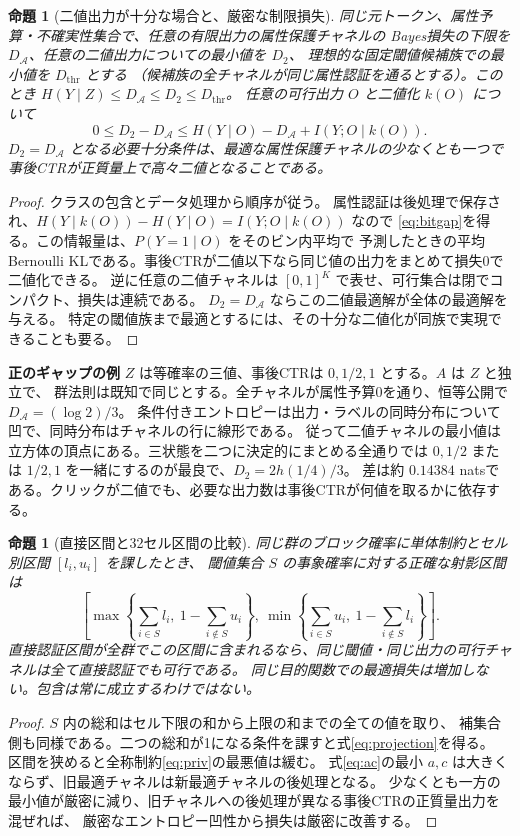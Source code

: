 \documentclass[a4paper,11pt]{ltjsarticle}
\theoremstyle{jp}
\newtheorem{prop}[thm]{命題}
\newcommand{\cA}{\mathcal A}
\newcommand{\para}[1]{\par\Needspace{3\baselineskip}\addvspace{.6\baselineskip}\noindent\textbf{#1}\enspace}
\begin{document}
\begin{prop}[二値出力が十分な場合と、厳密な制限損失]\label{th:binarygap}
同じ元トークン、属性予算・不確実性集合で、任意の有限出力の属性保護チャネルの
Bayes損失の下限を \(D_{\cA}\)、任意の二値出力についての最小値を \(D_2\)、
理想的な固定閾値候補族での最小値を \(D_{\mathrm{thr}}\) とする
（候補族の全チャネルが同じ属性認証を通るとする）。このとき
\(H(Y\mid Z)\le D_{\cA}\le D_2\le D_{\mathrm{thr}}\)。
任意の可行出力 \(O\) と二値化 \(k(O)\) について
\[
 0\le D_2-D_{\cA}\le
     H(Y\mid O)-D_{\cA}+I(Y;O\mid k(O)).
 \tag{6}\label{eq:bitgap}
\]
\(D_2=D_{\cA}\) となる必要十分条件は、最適な属性保護チャネルの少なくとも一つで
事後CTRが正質量上で高々二値となることである。
\end{prop}
\begin{proof}
クラスの包含とデータ処理から順序が従う。
属性認証は後処理で保存され、\(H(Y\mid k(O))-H(Y\mid O)=I(Y;O\mid k(O))\) なので
\eqref{eq:bitgap}を得る。この情報量は、\(P(Y=1\mid O)\) をそのビン内平均で
予測したときの平均Bernoulli KLである。事後CTRが二値以下なら同じ値の出力をまとめて損失0で二値化できる。
逆に任意の二値チャネルは \([0,1]^K\) で表せ、可行集合は閉でコンパクト、損失は連続である。
\(D_2=D_{\cA}\) ならこの二値最適解が全体の最適解を与える。
特定の閾値族まで最適とするには、その十分な二値化が同族で実現できることも要る。
\end{proof}

\para{正のギャップの例}
\(Z\) は等確率の三値、事後CTRは \(0,1/2,1\) とする。\(A\) は \(Z\) と独立で、
群法則は既知で同じとする。全チャネルが属性予算0を通り、恒等公開で \(D_{\cA}=(\log2)/3\)。
条件付きエントロピーは出力・ラベルの同時分布について凹で、同時分布はチャネルの行に線形である。
従って二値チャネルの最小値は立方体の頂点にある。三状態を二つに決定的にまとめる全通りでは
\(0,1/2\) または \(1/2,1\) を一緒にするのが最良で、\(D_2=2h(1/4)/3\)。
差は約 \(0.14384\) natsである。クリックが二値でも、必要な出力数は事後CTRが何値を取るかに依存する。

\begin{prop}[直接区間と32セル区間の比較]\label{th:boxes}
同じ群のブロック確率に単体制約とセル別区間 \([l_i,u_i]\) を課したとき、
閾値集合 \(S\) の事象確率に対する正確な射影区間は
\[
 \left[
 \max\!\left\{\sum_{i\in S}l_i,\ 1-\sum_{i\notin S}u_i\right\},
 \ \min\!\left\{\sum_{i\in S}u_i,\ 1-\sum_{i\notin S}l_i\right\}
 \right]. \tag{7}\label{eq:projection}
\]
直接認証区間が全群でこの区間に含まれるなら、同じ閾値・同じ出力の可行チャネルは全て直接認証でも可行である。
同じ目的関数での最適損失は増加しない。包含は常に成立するわけではない。
\end{prop}
\begin{proof}
\(S\) 内の総和はセル下限の和から上限の和までの全ての値を取り、
補集合側も同様である。二つの総和が1になる条件を課すと式\eqref{eq:projection}を得る。
区間を狭めると全称制約\eqref{eq:priv}の最悪値は緩む。
式\eqref{eq:ac}の最小 \(a,c\) は大きくならず、旧最適チャネルは新最適チャネルの後処理となる。
少なくとも一方の最小値が厳密に減り、旧チャネルへの後処理が異なる事後CTRの正質量出力を混ぜれば、
厳密なエントロピー凹性から損失は厳密に改善する。
\end{proof}
\end{document}
